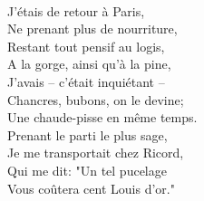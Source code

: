 \\J'étais de retour à Paris,
\\Ne prenant plus de nourriture,
\\Restant tout pensif au logis,
\\A la gorge, ainsi qu'à la pine,
\\J'avais – c'était inquiétant –
\\Chancres, bubons, on le devine;
\\Une chaude-pisse en même temps.
\\Prenant le parti le plus sage,
\\Je me transportait chez Ricord,
\\Qui me dit: "Un tel pucelage
\\Vous coûtera cent Louis d'or."


\breakpage